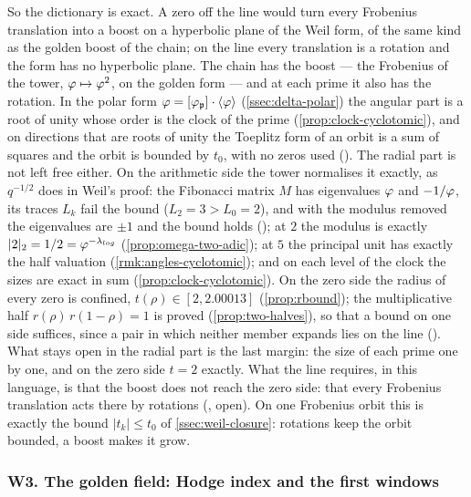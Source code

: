 So the dictionary is exact.  A zero off the line would turn every Frobenius translation into
a boost on a hyperbolic plane of the Weil form, of the same kind as the golden boost of the
chain; on the line every translation is a rotation and the form has no hyperbolic plane.  The
chain has the boost --- the Frobenius of the tower,
$\varphi\mapsto\varphi^2$, on the golden form --- and
at each prime it also has the rotation.  In the polar
form $\varphi=[\varphi_{\mathfrak p}]\cdot\langle\varphi\rangle$
(\cref{ssec:delta-polar}) the angular part is a root of
unity whose order is the clock of the prime
(\cref{prop:clock-cyclotomic}), and on directions that
are roots of unity the Toeplitz form of an orbit is a
sum of squares and the orbit is bounded by $t_0$, with
no zeros used
().  The radial part is not left free either.  On the
arithmetic side the tower normalises it exactly, as
$q^{-1/2}$ does in Weil's proof: the Fibonacci matrix
$M$ has eigenvalues $\varphi$ and $-1/\varphi$, its
traces $L_k$ fail the bound ($L_2=3>L_0=2$), and with the
modulus removed the eigenvalues are $\pm1$ and the bound
holds
(); at $2$ the modulus is exactly
$|2|_2=1/2=\varphi^{-\lambda_{log}}$
(\cref{prop:omega-two-adic}); at $5$ the principal unit
has exactly the half valuation
(\cref{rmk:angles-cyclotomic}); and on each level of the
clock the sizes are exact in sum
(\cref{prop:clock-cyclotomic}).  On the zero side the
radius of every zero is confined, $t(\rho)\in[2,2.00013]$
(\cref{prop:rbound}); the multiplicative half
$r(\rho)\,r(1-\rho)=1$ is proved
(\cref{prop:two-halves}), so that a bound on one side
suffices, since a pair in which neither member expands
lies on the line
().  What stays open in the radial part is the
last margin: the size of each prime one by one, and on
the zero side $t=2$ exactly.
What the line requires, in this language, is that the boost does not reach the zero side:
that every Frobenius translation acts there by rotations
(, open).  On one Frobenius orbit this is exactly
the bound $|t_k|\le t_0$ of \cref{ssec:weil-closure}: rotations keep the orbit bounded, a boost
makes it grow.

\subsubsection{W3. The golden field: Hodge index and the first windows}\label{ssec:golden-field}

